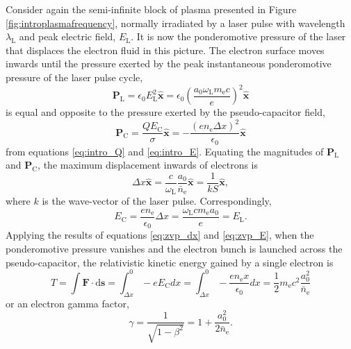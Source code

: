 Consider again the semi-infinite block of plasma presented in Figure \ref{fig:introplasmafrequency}, normally irradiated by a laser pulse with wavelength $\lambda_\mathrm{L}$ and peak electric field, $E_\mathrm{L}$. It is now the ponderomotive pressure of the laser that displaces the electron fluid in this picture. The electron surface moves inwards until the pressure exerted by the peak instantaneous ponderomotive pressure of the laser pulse cycle,
\begin{equation}
	\mathbf{P}_\mathrm{L} = \epsilon_0 E^2_\mathrm{L} \hat{\mathbf{x}} = \epsilon_0 \left(\frac{a_0\omega_\mathrm{L}m_\mathrm{e}c}{e}\right)^2 \hat{\mathbf{x}}
\end{equation}
is equal and opposite to the pressure exerted by the pseudo-capacitor field,
\begin{equation}
	\mathbf{P}_\mathrm{C} = \frac{QE_\mathrm{C}}{\sigma} \hat{\mathbf{x}}= -\frac{(en_\mathrm{e}\Delta x)^2}{\epsilon_0}\hat{\mathbf{x}}
\end{equation} 
from equations \ref{eq:intro_Q} and \ref{eq:intro_E}. Equating the magnitudes of $\mathbf{P}_\mathrm{L}$ and $\mathbf{P}_\mathrm{C}$, the maximum displacement inwards of electrons is
\begin{equation}\label{eq:zvp_dx}
	\Delta x \hat{\mathbf{x}} = \frac{c}{\omega_\mathrm{L}}\frac{a_0}{\bar{n}_\mathrm{e}}\hat{\mathbf{x}}  = \frac{1}{kS}\hat{\mathbf{x}},
\end{equation}
where $k$ is the wave-vector of the laser pulse. Correspondingly,
\begin{equation}\label{eq:zvp_E}
	E_\mathrm{C} = \frac{en_\mathrm{e}}{\epsilon_0}\Delta x = \frac{\omega_\mathrm{L}cm_\mathrm{e}a_0}{e} = E_\mathrm{L}.
\end{equation}
Applying the results of equations \ref{eq:zvp_dx} and \ref{eq:zvp_E}, when the ponderomotive pressure vanishes and the electron bunch is launched across the pseudo-capacitor, the relativistic kinetic energy gained by a single electron is
\begin{equation}\label{eq:zvp_T}
	T =  \int \mathbf{F}\cdot\mathrm{d}\mathbf{s} = \int^0_{\Delta x} -eE_\mathrm{C}dx = \int^0_{\Delta x}-\frac{en_\mathrm{e}x}{\epsilon_0}dx = \frac{1}{2}m_\mathrm{e}c^2\frac{a^2_0}{\bar{n}_\mathrm{e}}
\end{equation}
or an electron gamma factor,
\begin{equation}\label{eq:zvp_gamma}
	\gamma = \frac{1}{\sqrt{1-\beta^2}} = 1 + \frac{a_0^2}{2\bar{n}_\mathrm{e}}.
\end{equation}
